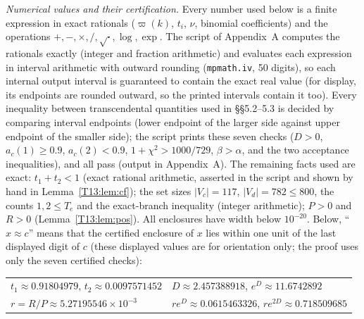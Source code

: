 \documentclass[11pt]{report}
\begin{document}
\emph{Numerical values and their certification.} Every number used below is a finite expression in exact rationals ($\varpi(k)$, $t_i$, $\nu$, binomial coefficients) and the operations $+,-,\times,/,\sqrt{\cdot},\log,\exp$. The script of Appendix~A computes the rationals exactly (integer and fraction arithmetic) and evaluates each expression in interval arithmetic with outward rounding (\texttt{mpmath.iv}, 50 digits), so each internal output interval is guaranteed to contain the exact real value (for display, its endpoints are rounded outward, so the printed intervals contain it too). Every inequality between transcendental quantities used in \S\S5.2--5.3 is decided by comparing interval endpoints (lower endpoint of the larger side against upper endpoint of the smaller side); the script prints these seven checks ($D>0$, $a_c(1)\ge0.9$, $a_c(2)<0.9$, $1+\chi^2>1000/729$, $\beta>\alpha$, and the two acceptance inequalities), and all pass (output in Appendix~A). The remaining facts used are exact: $t_1+t_2<1$ (exact rational arithmetic, asserted in the script and shown by hand in Lemma~\ref{T13:lem:cf}); the set sizes $|V_c|=117$, $|V_d|=782\le800$, the counts $1,2\le T_e$ and the exact-branch inequality (integer arithmetic); $P>0$ and $R>0$ (Lemma~\ref{T13:lem:pos}). All enclosures have width below $10^{-20}$. Below, ``$x\approx c$'' means that the certified enclosure of $x$ lies within one unit of the last displayed digit of $c$ (these displayed values are for orientation only; the proof uses only the seven certified checks):
\begin{center}
\begin{tabular}{ll}
$t_1\approx0.91804979$, $t_2\approx0.0097571452$ & $D\approx2.457388918$, $e^D\approx11.6742892$\\
$r=R/P\approx5.27195546\times10^{-3}$ & $re^D\approx0.0615463326$, $re^{2D}\approx0.718509685$
\end{tabular}
\end{center}
\end{document}
